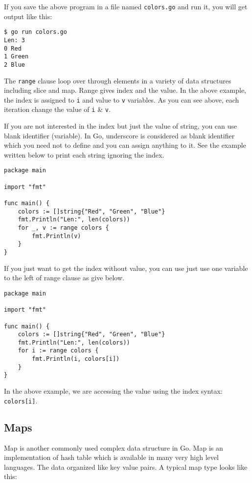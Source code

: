 If you save the above program in a file named \texttt{colors.go} and
run it, you will get output like this:

\begin{lstlisting}[numbers=none]
$ go run colors.go
Len: 3
0 Red
1 Green
2 Blue
\end{lstlisting}

The \texttt{range} clause loop over through elements in a
variety of data structures including slice and map.  Range gives index
and the value.  In the above example, the index is assigned
to \texttt{i} and value to \texttt{v} variables.  As you can see
above, each iteration change the value of \texttt{i} \& \texttt{v}.

If you are not interested in the index but just the value of string,
you can use blank identifier (variable).  In Go, underscore is
considered as blank identifier which you need not to define and you can
assign anything to it.  See the example written below to print each
string ignoring the index.

\begin{lstlisting}
package main

import "fmt"

func main() {
    colors := []string{"Red", "Green", "Blue"}
    fmt.Println("Len:", len(colors))
    for _, v := range colors {
        fmt.Println(v)
    }
}
\end{lstlisting}

If you just want to get the index without value, you can use just use
one variable to the left of range clause as give below.

\begin{lstlisting}
package main

import "fmt"

func main() {
    colors := []string{"Red", "Green", "Blue"}
    fmt.Println("Len:", len(colors))
    for i := range colors {
        fmt.Println(i, colors[i])
    }
}
\end{lstlisting}

In the above example, we are accessing the value using the index
syntax: \texttt{colors[i]}.

\subsection{Maps}

Map is another commonly used complex data structure in Go.
Map is an implementation of hash table which is available in many very
high level languages.  The data organized like key value pairs.  A
typical map type looks like this:

